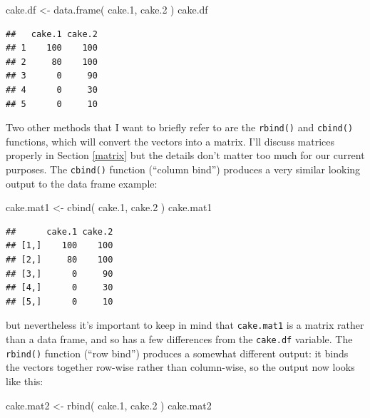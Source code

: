 \documentclass[
]{book}
\newenvironment{Shaded}{\begin{snugshade}}{\end{snugshade}}
\newcommand{\FloatTok}[1]{\textcolor[rgb]{0.00,0.00,0.81}{#1}}
\newcommand{\FunctionTok}[1]{\textcolor[rgb]{0.00,0.00,0.00}{#1}}
\newcommand{\NormalTok}[1]{#1}
\newcommand{\OtherTok}[1]{\textcolor[rgb]{0.56,0.35,0.01}{#1}}
\begin{document}
\begin{Shaded}
\begin{Highlighting}[]
\NormalTok{cake.df }\OtherTok{\textless{}{-}} \FunctionTok{data.frame}\NormalTok{( cake}\FloatTok{.1}\NormalTok{, cake}\FloatTok{.2}\NormalTok{ )}
\NormalTok{cake.df}
\end{Highlighting}
\end{Shaded}

\begin{verbatim}
##   cake.1 cake.2
## 1    100    100
## 2     80    100
## 3      0     90
## 4      0     30
## 5      0     10
\end{verbatim}

Two other methods that I want to briefly refer to are the \texttt{rbind()} and \texttt{cbind()} functions, which will convert the vectors into a matrix. I'll discuss matrices properly in Section \ref{matrix} but the details don't matter too much for our current purposes. The \texttt{cbind()} function (``column bind'') produces a very similar looking output to the data frame example:

\begin{Shaded}
\begin{Highlighting}[]
\NormalTok{cake.mat1 }\OtherTok{\textless{}{-}} \FunctionTok{cbind}\NormalTok{( cake}\FloatTok{.1}\NormalTok{, cake}\FloatTok{.2}\NormalTok{ )}
\NormalTok{cake.mat1}
\end{Highlighting}
\end{Shaded}

\begin{verbatim}
##      cake.1 cake.2
## [1,]    100    100
## [2,]     80    100
## [3,]      0     90
## [4,]      0     30
## [5,]      0     10
\end{verbatim}

but nevertheless it's important to keep in mind that \texttt{cake.mat1} is a matrix rather than a data frame, and so has a few differences from the \texttt{cake.df} variable. The \texttt{rbind()} function (``row bind'') produces a somewhat different output: it binds the vectors together row-wise rather than column-wise, so the output now looks like this:

\begin{Shaded}
\begin{Highlighting}[]
\NormalTok{cake.mat2 }\OtherTok{\textless{}{-}} \FunctionTok{rbind}\NormalTok{( cake}\FloatTok{.1}\NormalTok{, cake}\FloatTok{.2}\NormalTok{ )}
\NormalTok{cake.mat2}
\end{Highlighting}
\end{Shaded}
\end{document}
